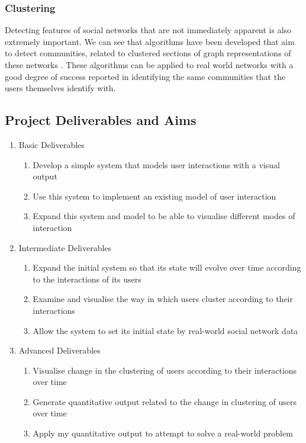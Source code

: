 \documentclass[12pt,a4paper]{article}
\begin{document}
\subsubsection{Clustering}
Detecting features of social networks that are not immediately apparent is also extremely important. We can see that algorithms have been developed that aim to detect communities, related to clustered sections of graph representations of these networks \cite{newman2004fast}. These algorithms can be applied to real world networks with a good degree of success reported in identifying the same communities that the users themselves identify with.

\subsection{Project Deliverables and Aims}
\begin{enumerate}
\item Basic Deliverables
\begin{enumerate}
\item Develop a simple system that models user interactions with a visual output
\item Use this system to implement an existing model of user interaction
\item Expand this system and model to be able to visualise different modes of interaction
\end{enumerate}
\item Intermediate Deliverables
\begin{enumerate}
\item Expand the initial system so that its state will evolve over time according to the interactions of its users
\item Examine and visualise the way in which users cluster according to their interactions
\item Allow the system to set its initial state by real-world social network data
\end{enumerate}
\item Advanced Deliverables
\begin{enumerate}
\item Visualise change in the clustering of users according to their interactions over time
\item Generate quantitative output related to the change in clustering of users over time
\item Apply my quantitative output to attempt to solve a real-world problem
\end{enumerate}
\end{enumerate}
\end{document}
